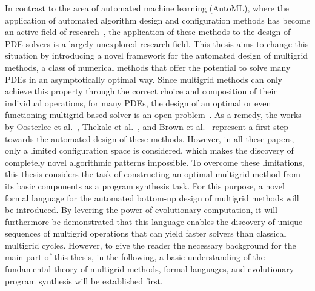 In contrast to the area of automated machine learning (AutoML), where the application of automated algorithm design and configuration methods has become an active field of research~\cite{ren2021comprehensive,hutter2019automated,elsken2019neural,he2021automl,schrodi2022towards}, the application of these methods to the design of PDE solvers is a largely unexplored research field.
This thesis aims to change this situation by introducing a novel framework for the automated design of multigrid methods, a class of numerical methods that offer the potential to solve many PDEs in an asymptotically optimal way.
Since multigrid methods can only achieve this property through the correct choice and composition of their individual operations, for many PDEs, the design of an optimal or even functioning multigrid-based solver is an open problem~\cite{trottenberg2000multigrid,ernst2012difficult}.
As a remedy, the works by Oosterlee et al.~\cite{oosterlee2003genetic}, Thekale et al.~\cite{thekale2010optimizing}, and Brown et al.~\cite{brown2021tuning} represent a first step towards the automated design of these methods.
However, in all these papers, only a limited configuration space is considered, which makes the discovery of completely novel algorithmic patterns impossible.
To overcome these limitations, this thesis considers the task of constructing an optimal multigrid method from its basic components as a program synthesis task.
For this purpose, a novel formal language for the automated bottom-up design of multigrid methods will be introduced.
By levering the power of evolutionary computation, it will furthermore be demonstrated that this language enables the discovery of unique sequences of multigrid operations that can yield faster solvers than classical multigrid cycles.
However, to give the reader the necessary background for the main part of this thesis, in the following, a basic understanding of the fundamental theory of multigrid methods, formal languages, and evolutionary program synthesis will be established first.
